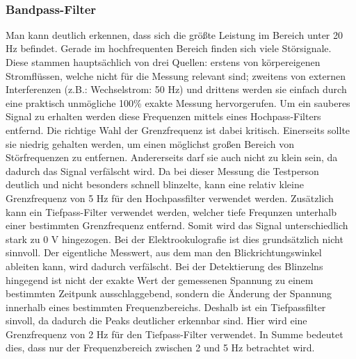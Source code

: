 \documentclass[11pt]{article}
\begin{document}
    \begin{center}
    \end{center}
    { \hspace*{\fill} \\}
    
    \subsubsection{Bandpass-Filter}\label{bandpass-filter}

Man kann deutlich erkennen, dass sich die größte Leistung im Bereich
unter 20 Hz befindet. Gerade im hochfrequenten Bereich finden sich viele
Störsignale. Diese stammen hauptsächlich von drei Quellen: erstens von
körpereigenen Stromflüssen, welche nicht für die Messung relevant sind;
zweitens von externen Interferenzen (z.B.: Wechselstrom: 50 Hz) und
drittens werden sie einfach durch eine praktisch unmögliche 100\% exakte
Messung hervorgerufen. Um ein sauberes Signal zu erhalten werden diese
Frequenzen mittels eines Hochpass-Filters entfernd. Die richtige Wahl
der Grenzfrequenz ist dabei kritisch. Einerseits sollte sie niedrig
gehalten werden, um einen möglichst großen Bereich von Störfrequenzen zu
entfernen. Andererseits darf sie auch nicht zu klein sein, da dadurch
das Signal verfälscht wird. Da bei dieser Messung die Testperson
deutlich und nicht besonders schnell blinzelte, kann eine relativ kleine
Grenzfrequenz von 5 Hz für den Hochpassfilter verwendet werden.
Zusätzlich kann ein Tiefpass-Filter verwendet werden, welcher tiefe
Frequnzen unterhalb einer bestimmten Grenzfrequenz entfernd. Somit wird
das Signal unterschiedlich stark zu 0 V hingezogen. Bei der
Elektrookulografie ist dies grundsätzlich nicht sinnvoll. Der
eigentliche Messwert, aus dem man den Blickrichtungswinkel ableiten
kann, wird dadurch verfälscht. Bei der Detektierung des Blinzelns
hingegend ist nicht der exakte Wert der gemessenen Spannung zu einem
bestimmten Zeitpunk ausschlaggebend, sondern die Änderung der Spannung
innerhalb eines bestimmten Frequenzbereichs. Deshalb ist ein
Tiefpassfilter sinvoll, da dadurch die Peaks deutlicher erkennbar sind.
Hier wird eine Grenzfrequenz von 2 Hz für den Tiefpass-Filter verwendet.
In Summe bedeutet dies, dass nur der Frequenzbereich zwischen 2 und 5 Hz
betrachtet wird.
\end{document}
